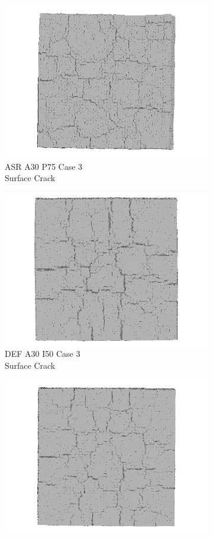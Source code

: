 \begin{figure}[ht]
\begin{subfigure}{.33\textwidth}
    \end{subfigure}
    \begin{subfigure}{.33\textwidth}
      \centering
      \includegraphics[width=.8\linewidth]{Files/exp_3D/ASR/A30P75_3_3ds.png}
      \caption{ASR A30 P75 Case 3 \\ Surface Crack}
    \end{subfigure}%
    \begin{subfigure}{.33\textwidth}
      \centering
      \includegraphics[width=.8\linewidth]{Files/exp_3D/DEF/A30X0C_3_3ds.png}
      \caption{DEF A30 I50 Case 3 \\ Surface Crack}
    \end{subfigure}%
    \begin{subfigure}{.33\textwidth}
      \centering
      \includegraphics[width=.8\linewidth]{Files/exp_3D/DEF/A30X-5C_3_3ds.png}

\end{subfigure}
\end{figure}
